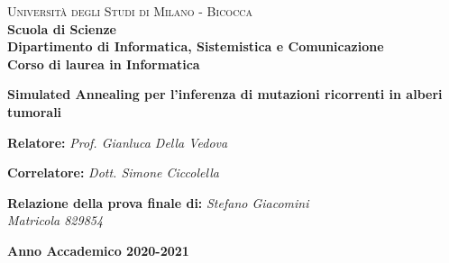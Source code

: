 \documentclass{report}
\begin{document}
\captionsetup[table]{name=Figura}

\begin{titlepage}


  \noindent
  \begin{minipage}[t]{0.19\textwidth}
  \end{minipage}
  \begin{minipage}[t]{0.81\textwidth}
    {
      {\textsc{Università degli Studi di Milano - Bicocca}}\\
      \textbf{Scuola di Scienze}\\
      \textbf{Dipartimento di Informatica, Sistemistica e Comunicazione}\\
      \textbf{Corso di laurea in Informatica}\\
      \par
    }
  \end{minipage}

  \vspace{40mm}

  \begin{center}
    {\LARGE{
        \textbf{Simulated Annealing per l'inferenza di mutazioni ricorrenti in alberi tumorali}}}
  \end{center}

  \vspace{50mm}

  \noindent
  {\large \textbf{Relatore:} \textit{Prof. Gianluca Della Vedova} }

  \noindent
  {\large \textbf{Correlatore:} \textit{Dott. Simone Ciccolella}}

  \vspace{15mm}

  \begin{flushright}
    \textbf{\large Relazione della prova finale di:}
    \large{\textit{Stefano Giacomini}}\\
    \large{\textit{Matricola 829854}}
  \end{flushright}

  \vspace{40mm}
  \begin{center}
    {\large{\bf Anno Accademico 2020-2021}}
  \end{center}

  \restoregeometry

\end{titlepage}
\restoregeometry
\end{document}
